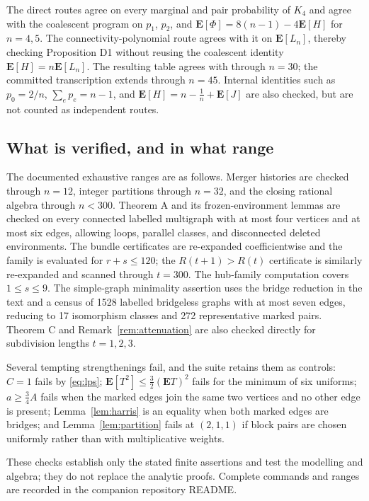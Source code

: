 \documentclass[11pt,a4paper]{amsart}
\theoremstyle{plain}
\theoremstyle{definition}
\theoremstyle{remark}
\newcommand{\E}{\mathbf{E}}
\begin{document}
The direct routes agree on every marginal and pair probability of $K_4$ and
agree with the coalescent program on $p_1$, $p_2$, and
$\E[\Phi]=8(n-1)-4\E[H]$ for $n=4,5$. The connectivity-polynomial route agrees
with it on $\E[L_n]$, thereby checking Proposition D1 without reusing the
coalescent identity $\E[H]=n\E[L_n]$. The resulting table agrees with
\cite{Gamarnik} through $n=30$; the committed transcription extends through
$n=45$. Internal identities such as $p_0=2/n$, $\sum_e p_e=n-1$, and
$\E[H]=n-\frac1n+\E[J]$ are also checked, but are not counted as independent
routes.

\subsection{What is verified, and in what range}

The documented exhaustive ranges are as follows. Merger histories are checked
through $n=12$, integer partitions through $n=32$, and the closing rational
algebra through $n<300$. Theorem A and its frozen-environment lemmas are checked
on every connected labelled multigraph with at most four vertices and at most
six edges, allowing loops, parallel classes, and disconnected deleted
environments. The bundle certificates are re-expanded coefficientwise and the
family is evaluated for $r+s\le120$; the $R(t+1)>R(t)$ certificate is similarly
re-expanded and scanned through $t=300$. The hub-family computation covers
$1\le s\le9$. The simple-graph minimality assertion uses the bridge reduction
in the text and a census of 1528 labelled bridgeless graphs with at most seven
edges, reducing to 17 isomorphism classes and 272 representative marked pairs.
Theorem C and Remark~\ref{rem:attenuation} are also checked directly for
subdivision lengths $t=1,2,3$.

Several tempting strengthenings fail, and the suite retains them as controls:
$C=1$ fails by \eqref{eq:lps}; $\E[T^2]\le\frac32(\E T)^2$ fails for the
minimum of six uniforms; $a\ge\frac34A$ fails when the marked edges join the
same two vertices and no other edge is present; Lemma~\ref{lem:harris} is an
equality when both marked edges are bridges; and Lemma~\ref{lem:partition}
fails at $(2,1,1)$ if block pairs are chosen uniformly rather than with
multiplicative weights.

These checks establish only the stated finite assertions and test the modelling
and algebra; they do not replace the analytic proofs. Complete commands and
ranges are recorded in the companion repository README.
\end{document}
